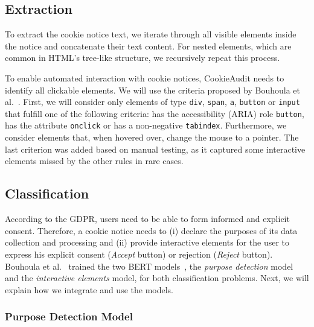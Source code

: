 \subsection{Extraction} \label{subsec:extraction}
To extract the cookie notice text, we iterate through all visible elements inside the notice and concatenate their text content.
For nested elements, which are common in HTML's tree-like structure, we recursively repeat this process.

To enable automated interaction with cookie notices, CookieAudit needs to identify all clickable elements.
We will use the criteria proposed by Bouhoula et al.~\cite{bouhoula2023automated}.
First, we will consider only elements of type \texttt{div}, \texttt{span}, \texttt{a}, \texttt{button} or \texttt{input} that fulfill one of the following criteria: 
has the accessibility (ARIA) role \texttt{button}, 
has the attribute \texttt{onclick} or
has a non-negative \texttt{tabindex}.
Furthermore, we consider elements that, when hovered over, change the mouse to a pointer.
The last criterion was added based on manual testing, as it captured some interactive elements missed by the other rules in rare cases.

\subsection{Classification}
According to the GDPR, users need to be able to form informed and explicit consent.
Therefore, a cookie notice needs to (i) declare the purposes of its data collection and processing and (ii) provide interactive elements for the user to express his explicit consent (\emph{Accept} button) or rejection (\emph{Reject} button).
Bouhoula et al.~\cite{bouhoula2023automated} trained the two BERT models~\cite{devlin2018bert}, the \emph{purpose detection} model and the \emph{interactive elements} model, for both classification problems.
Next, we will explain how we integrate and use the models.

\subsubsection{Purpose Detection Model}


